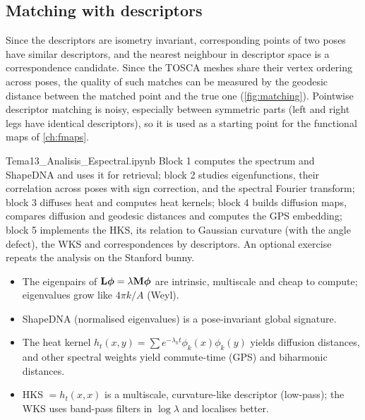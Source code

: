 
\subsection{Matching with descriptors}

Since the descriptors are isometry invariant, corresponding points of two poses have similar
descriptors, and the nearest neighbour in descriptor space is a correspondence candidate. Since the
TOSCA meshes share their vertex ordering across poses, the quality of such matches can be measured by
the geodesic distance between the matched point and the true one (\cref{fig:matching}). Pointwise
descriptor matching is noisy, especially between symmetric parts (left and right legs have identical
descriptors), so it is used as a starting point for the functional maps of \cref{ch:fmaps}.


\begin{notebook}{Tema13\_Analisis\_Espectral.ipynb}
Block 1 computes the spectrum and ShapeDNA and uses it for retrieval; block 2 studies eigenfunctions,
their correlation across poses with sign correction, and the spectral Fourier transform; block 3
diffuses heat and computes heat kernels; block 4 builds diffusion maps, compares diffusion and geodesic
distances and computes the GPS embedding; block 5 implements the HKS, its relation to Gaussian
curvature (with the angle defect), the WKS and correspondences by descriptors. An optional exercise
repeats the analysis on the Stanford bunny.
\end{notebook}

\begin{keypoints}
\begin{itemize}[leftmargin=*]
  \item The eigenpairs of $\mathbf{L}\boldsymbol{\phi}=\lambda\mathbf{M}\boldsymbol{\phi}$ are intrinsic, multiscale and cheap to compute;
  eigenvalues grow like $4\pi k/A$ (Weyl).
  \item ShapeDNA (normalised eigenvalues) is a pose-invariant global signature.
  \item The heat kernel $h_t(x,y)=\sum e^{-\lambda_kt}\phi_k(x)\phi_k(y)$ yields diffusion distances,
  and other spectral weights yield commute-time (GPS) and biharmonic distances.
  \item HKS $=h_t(x,x)$ is a multiscale, curvature-like descriptor (low-pass); the WKS uses band-pass
  filters in $\log\lambda$ and localises better.
\end{itemize}
\end{keypoints}


